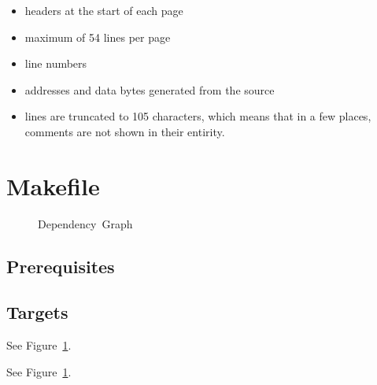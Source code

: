 \documentclass{article}
\begin{document}
\begin{itemize}
\item headers at the start of each page
\item maximum of 54 lines per page
\item line numbers
\item addresses and data bytes generated from the source
\item lines are truncated to 105 characters, which means that in a few places, comments are not shown in their entirity.
\end{itemize}

\section{Makefile}

\begin{figure}
\caption{Dependency~Graph}
\label{fig:graph}
\end{figure}

\subsection{Prerequisites}


\subsection{Targets}

See Figure~\ref{fig:graph}.


See Figure~\ref{fig:graph}.
\end{document}
